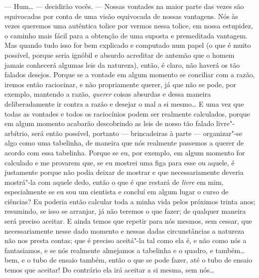 --- Hum\ldots{} --- decidirão vocês. --- Nossas vontades na maior parte das vezes
são equivocadas por conta de uma visão equivocada de nossas vantagens.
Nós às vezes queremos uma autêntica tolice por vermos nessa tolice, em
nossa estupidez, o caminho mais fácil para a obtenção de uma suposta e
premeditada vantagem. Mas quando tudo isso for bem explicado e
computado num papel (o que é muito possível, porque seria ignóbil e
absurdo acreditar de antemão que o homem jamais conhecerá algumas leis
da natureza), então, é claro, não haverá os tão falados desejos. Porque
se a vontade em algum momento se conciliar com a razão, iremos então
raciocinar, e não propriamente querer, já que não se pode, por exemplo,
mantendo a razão, \textit{querer} coisas absurdas e dessa maneira
deliberadamente ir contra a razão e desejar o mal a si mesmo\ldots{} E uma
vez que todas as vontades e todos os raciocínios podem ser realmente
calculados, porque em algum momento acabarão descobrindo as leis de
nosso tão falado livre"-arbítrio, será então possível, portanto ---
brincadeiras à parte --- organizar"-se algo como uma tabelinha, de maneira
que nós realmente passemos a querer de acordo com essa tabelinha.
Porque se eu, por exemplo, em algum momento for calculado e me provarem
que, se eu mostrei uma figa para esse ou aquele, é justamente porque
não podia deixar de mostrar e que necessariamente deveria mostrá"-la com
aquele dedo, então o que é que restará de \textit{livre} em mim,
especialmente se eu sou um cientista e concluí em algum lugar o curso
de ciências? Eu poderia então calcular toda a minha vida pelos próximos
trinta anos; resumindo, se isso se arranjar, já não teremos o que
fazer; de qualquer maneira será preciso aceitar. E ainda temos que
repetir para nós mesmos, sem cessar, que necessariamente nesse dado
momento e nessas dadas circunstâncias a natureza não nos presta contas;
que é preciso aceitá"-la tal como ela é, e não como nós a fantasiamos, e
se nós realmente almejamos a tabelinha e o quadro, e também\ldots{} bem, e o
tubo de ensaio também, então o que se pode fazer, até o tubo de ensaio
temos que aceitar! Do contrário ela irá aceitar a si mesma, sem nós\ldots{}

